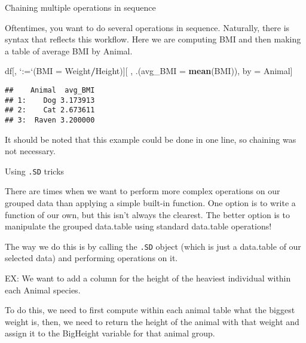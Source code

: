 \documentclass[ignorenonframetext,]{beamer}
\newenvironment{Shaded}{\begin{snugshade}}{\end{snugshade}}
\newcommand{\DataTypeTok}[1]{\textcolor[rgb]{0.13,0.29,0.53}{#1}}
\newcommand{\KeywordTok}[1]{\textcolor[rgb]{0.13,0.29,0.53}{\textbf{#1}}}
\newcommand{\NormalTok}[1]{#1}
\newcommand{\OperatorTok}[1]{\textcolor[rgb]{0.81,0.36,0.00}{\textbf{#1}}}
\newcommand{\StringTok}[1]{\textcolor[rgb]{0.31,0.60,0.02}{#1}}
\begin{document}
\begin{frame}[fragile]{Chaining multiple operations in sequence}
\protect\hypertarget{chaining-multiple-operations-in-sequence}{}

Oftentimes, you want to do several operations in sequence. Naturally,
there is syntax that reflects this workflow. Here we are computing BMI
and then making a table of average BMI by Animal.

\begin{Shaded}
\begin{Highlighting}[]
\NormalTok{df[, }\StringTok{`}\DataTypeTok{:=}\StringTok{`}\NormalTok{(}\DataTypeTok{BMI =}\NormalTok{ Weight}\OperatorTok{/}\NormalTok{Height)][}
\NormalTok{  , .(}\DataTypeTok{avg_BMI =} \KeywordTok{mean}\NormalTok{(BMI)), by =}\StringTok{ }\NormalTok{Animal]}
\end{Highlighting}
\end{Shaded}

\begin{verbatim}
##    Animal  avg_BMI
## 1:    Dog 3.173913
## 2:    Cat 2.673611
## 3:  Raven 3.200000
\end{verbatim}

It should be noted that this example could be done in one line, so
chaining was not necessary.

\end{frame}

\begin{frame}[fragile]{Using \texttt{.SD} tricks}
\protect\hypertarget{using-.sd-tricks}{}

There are times when we want to perform more complex operations on our
grouped data than applying a simple built-in function. One option is to
write a function of our own, but this isn't always the clearest. The
better option is to manipulate the grouped data.table using standard
data.table operations!

The way we do this is by calling the \texttt{.SD} object (which is just
a data.table of our selected data) and performing operations on it.

EX: We want to add a column for the height of the heaviest individual
within each Animal species.

To do this, we need to first compute within each animal table what the
biggest weight is, then, we need to return the height of the animal with
that weight and assign it to the BigHeight variable for that animal
group.

\end{frame}
\end{document}
